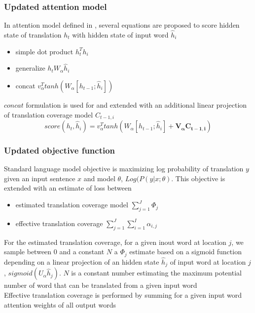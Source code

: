 \documentclass[a4paper]{article}
\begin{document}
\subsubsection{Updated attention model}
In attention model defined in \citep{luong2015}, several equations are proposed to score hidden state of translation $h_{t}$ with hidden state of input word $\widehat{h}_{i}$
\begin{itemize}
\item simple dot product $h^{T}_{t}h_{i}$ 
\item generalize $h_{t}W_{\alpha}\widehat{h}_{i}$
\item concat $v_{\alpha}^{T}tanh(W_{\alpha}[h_{t-1};\widehat{h}_{i}])$
\end{itemize}

$concat$ formulation is used for \citep{zhaopeng2016} and extended with an additional linear projection of translation coverage model $C_{t-1,i}$
\begin{equation}
score(h_{t},\widehat{h}_{i}) = v_{\alpha}^{T}tanh(W_{\alpha}[h_{t-1};\widehat{h}_{i}] + \boldsymbol{V_{\alpha}C_{t-1,i}})
\end{equation}


\subsubsection{Updated objective function}
Standard language model objective is maximizing log probability of translation $y$ given an input sentence $x$ and model $\theta$,  $Log(P(y \vert x;\theta)$. This objective  is extended with an estimate of loss between \begin{itemize}
\item estimated translation coverage model $\sum^{J}_{j=1}\Phi_{j}$
\item effective translation coverage $\sum^{J}_{j=1}\sum^{I}_{i=1}\alpha_{i,j}$
\end{itemize}  

For the estimated translation coverage, for a given inout word at location $j$, we sample between 0 and a constant $N$ a $\Phi_{j}$ estimate based on a sigmoid function depending on a linear projection of an hidden state $\widehat{h}_{j}$ of input word at location $j$, $sigmoid(U_{\alpha}\widehat{h}_{j})$. $N$ is a constant number estimating the maximum potential number of word that can be translated from a given input word\\
Effective translation coverage is performed by summing for a given input word attention weights of all output words 
\end{document}
